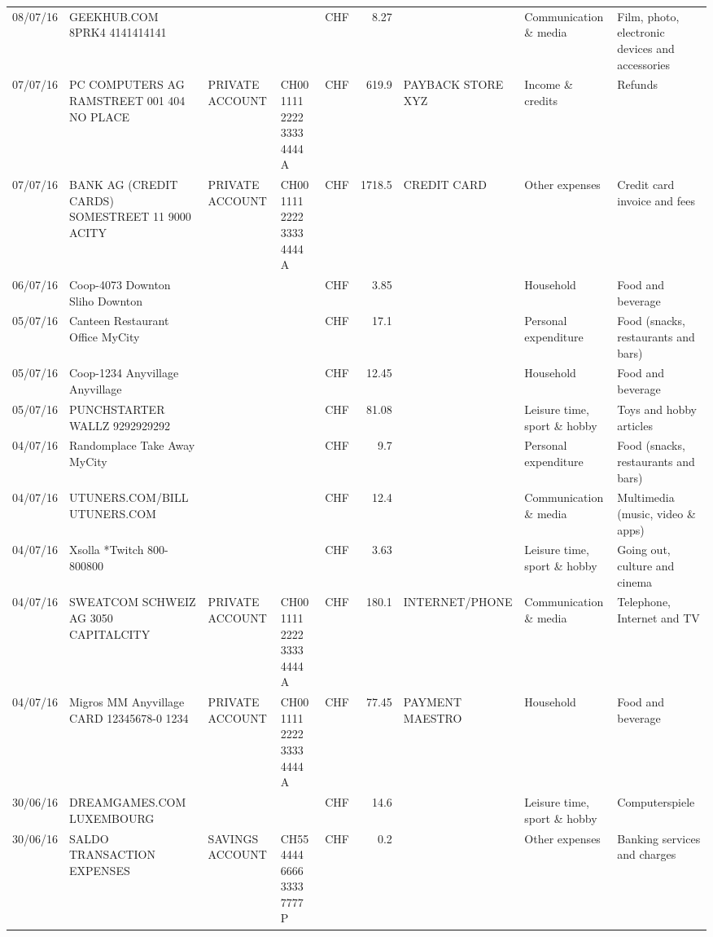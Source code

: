 \begin{landscape}
\begin{table}[h]
\begin{center}
\begin{tabular}{rllllrlll}
		08/07/16 & GEEKHUB.COM  8PRK4        4141414141 &       &       & CHF   & 8.27  &       & Communication \& media & Film, photo, electronic devices and accessories \\
		07/07/16 & PC COMPUTERS AG RAMSTREET 001 404 NO PLACE & PRIVATE ACCOUNT & CH00 1111 2222 3333 4444 A & CHF   & 619.9 & PAYBACK STORE XYZ & Income \& credits & Refunds \\
		07/07/16 & BANK AG (CREDIT CARDS) SOMESTREET 11 9000 ACITY & PRIVATE ACCOUNT & CH00 1111 2222 3333 4444 A & CHF   & 1718.5 & CREDIT CARD & Other expenses & Credit card invoice and fees \\
		06/07/16 & Coop-4073 Downton Sliho   Downton &       &       & CHF   & 3.85  &       & Household & Food and beverage \\
		05/07/16 & Canteen Restaurant Office      MyCity &       &       & CHF   & 17.1  &       & Personal expenditure & Food (snacks, restaurants and bars) \\
		05/07/16 & Coop-1234 Anyvillage    Anyvillage &       &       & CHF   & 12.45 &       & Household & Food and beverage \\
		05/07/16 & PUNCHSTARTER WALLZ   9292929292 &       &       & CHF   & 81.08 &       & Leisure time, sport \& hobby & Toys and hobby articles \\
		04/07/16 & Randomplace Take Away     MyCity &       &       & CHF   & 9.7   &       & Personal expenditure & Food (snacks, restaurants and bars) \\
		04/07/16 & UTUNERS.COM/BILL          UTUNERS.COM &       &       & CHF   & 12.4  &       & Communication \& media & Multimedia (music, video \& apps) \\
		04/07/16 & Xsolla *Twitch           800-800800 &       &       & CHF   & 3.63  &       & Leisure time, sport \& hobby & Going out, culture and cinema \\
		04/07/16 & SWEATCOM SCHWEIZ AG 3050 CAPITALCITY & PRIVATE ACCOUNT & CH00 1111 2222 3333 4444 A & CHF   & 180.1 & INTERNET/PHONE & Communication \& media & Telephone,  Internet and TV \\
		04/07/16 & Migros MM Anyvillage CARD 12345678-0 1234 & PRIVATE ACCOUNT & CH00 1111 2222 3333 4444 A & CHF   & 77.45 & PAYMENT MAESTRO & Household & Food and beverage \\
		30/06/16 & DREAMGAMES.COM           LUXEMBOURG &       &       & CHF   & 14.6  &       & Leisure time, sport \& hobby & Computerspiele \\
		30/06/16 & SALDO TRANSACTION EXPENSES & SAVINGS ACCOUNT & CH55 4444 6666 3333 7777 P & CHF   & 0.2   &       & Other expenses & Banking services and charges \\

\end{tabular}
\end{center}
\end{table}
\end{landscape}
